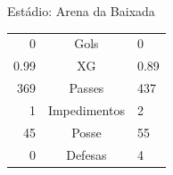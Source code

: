 \documentclass[11pt]{article}
\begin{document}
\vspace{0.5cm}
\begin{minipage}{0.65\textwidth}
\begin{center}
\begin{tabular}{rl}
\end{tabular}
\end{center}
\end{minipage}
\begin{minipage}{0.3\textwidth}
Estádio: Arena da Baixada\\
\begin{tabular}{rcl}
0 & Gols & 0 \\
0.99 & XG & 0.89 \\
369 & Passes & 437 \\
1 & Impedimentos & 2 \\
45 & Posse & 55 \\
0 & Defesas & 4 \\
\end{tabular}
\end{minipage}
\newpage
\end{document}
